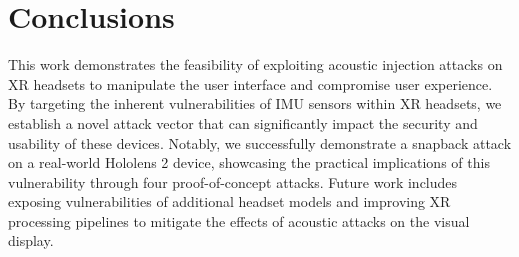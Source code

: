\section{Conclusions}
\label{sec:conclusions}

This work demonstrates the feasibility of exploiting acoustic injection attacks on XR headsets to manipulate the user interface and compromise user experience. By targeting the inherent vulnerabilities of IMU sensors within XR headsets, we establish a novel attack vector that can significantly impact the security and usability of these devices.
Notably, we successfully demonstrate a snapback attack on a real-world Hololens 2 device, showcasing the practical implications of this vulnerability through four proof-of-concept attacks.
Future work includes exposing vulnerabilities of additional headset models and improving XR processing pipelines to mitigate the effects of acoustic attacks on the visual display.

